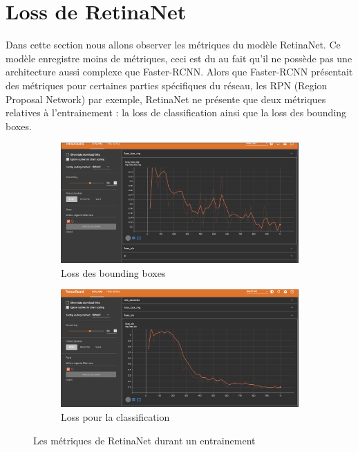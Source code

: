 \section {Loss de RetinaNet}\label{anal:train_retina}
Dans cette section nous allons observer les métriques du modèle RetinaNet. Ce modèle enregistre moins de métriques, ceci est du au fait qu'il ne possède pas une architecture aussi complexe que Faster-RCNN. Alors que Faster-RCNN présentait des métriques pour certaines parties spécifiques du réseau, les RPN (Region Proposal Network) par exemple, RetinaNet ne présente que deux métriques relatives à l'entrainement : la loss de classification ainsi que la loss des bounding boxes.
\begin{figure}[h!]
    \begin{subfigure}[h]{0.49\textwidth}
        \centering
        \includegraphics[width=\textwidth]{images/tensorboard_retina_net_loss_box.png}
        \caption{Loss des bounding boxes}
        \label{fig:loss_retinanet_box}
    \end{subfigure}
    \begin{subfigure}[h]{0.49\textwidth}
        \centering
        \includegraphics[width=\textwidth]{images/tensorboard_retina_net_loss_cls.png}
        \caption{Loss pour la classification}
        \label{fig:loss_retinanet_cls}
    \end{subfigure}
    \caption{Les métriques de RetinaNet durant un entrainement}
\end{figure}
